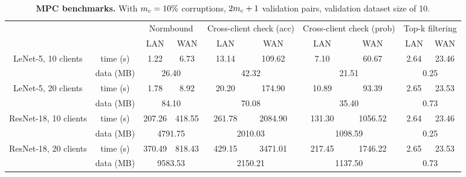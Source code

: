 \begin{table}[b!]
\centering
\caption{\textbf{MPC benchmarks.} With $m_c = 10\%$ corruptions, $2m_c + 1$ validation pairs, validation dataset size of 10.}

\begin{adjustbox}{width=\columnwidth,center}
\begin{tabular}{cc|cc|cc|cc|cc}
\toprule
     & & \multicolumn{2}{c|}{Normbound} & \multicolumn{2}{c|}{Cross-client check (acc)} & \multicolumn{2}{c|}{Cross-client check (prob)} & \multicolumn{2}{c}{Top-k filtering} \\ \cline{3-10}
     & & LAN & WAN & LAN & WAN & LAN & WAN & LAN & WAN \\
     \hline \hline
    \multirow{2}{*}{LeNet-5, 10 clients} & time (s) & 1.22 & 6.73 & 13.14 & 109.62 & 7.10 & 60.67 & 2.64 & 23.46 \\
    & data (MB) & \multicolumn{2}{c|}{26.40} & \multicolumn{2}{c|}{42.32} & \multicolumn{2}{c|}{21.51} & \multicolumn{2}{c}{0.25} \\ \cline{1-10}
    \multirow{2}{*}{LeNet-5, 20 clients} & time (s) & 1.78 & 8.92 & 20.20 & 174.90 & 10.89 & 93.39 & 2.65 & 23.53 \\
    & data (MB) & \multicolumn{2}{c|}{84.10} & \multicolumn{2}{c|}{70.08} & \multicolumn{2}{c|}{35.40} & \multicolumn{2}{c}{0.73} \\ \cline{1-10}
    \multirow{2}{*}{ResNet-18, 10 clients} & time (s) & 207.26 & 418.55 & 261.78 & 2084.90 & 131.30 & 1056.52 & 2.64 & 23.46 \\
    & data (MB) & \multicolumn{2}{c|}{4791.75} & \multicolumn{2}{c|}{2010.03} & \multicolumn{2}{c|}{1098.59} & \multicolumn{2}{c}{0.25} \\ \cline{1-10}
    \multirow{2}{*}{ResNet-18, 20 clients} & time (s) & 370.49 & 818.43 & 429.15 & 3471.01 & 217.45 & 1746.22 & 2.65 & 23.53 \\
    & data (MB) & \multicolumn{2}{c|}{9583.53} & \multicolumn{2}{c|}{2150.21} & \multicolumn{2}{c|}{1137.50} & \multicolumn{2}{c}{0.73} \\
   
\bottomrule
\end{tabular}
\end{adjustbox}

\label{tab:mpc-benchmark}
\end{table}
